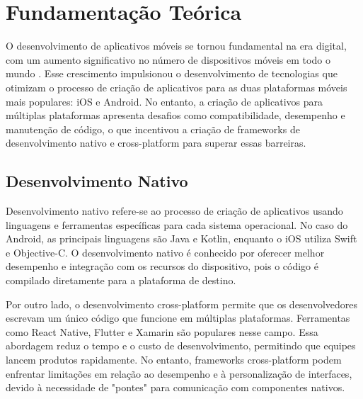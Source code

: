 \chapter{Fundamentação Teórica}
O desenvolvimento de aplicativos móveis se tornou fundamental na era digital, com um aumento significativo no número de dispositivos móveis em todo o mundo \cite{statista:uso_celular}. Esse crescimento impulsionou o desenvolvimento de tecnologias que otimizam o processo de criação de aplicativos para as duas plataformas móveis mais populares: iOS e Android. No entanto, a criação de aplicativos para múltiplas plataformas apresenta desafios como compatibilidade, desempenho e manutenção de código, o que incentivou a criação de frameworks de desenvolvimento nativo e cross-platform para superar essas barreiras.

\section{Desenvolvimento Nativo}
Desenvolvimento nativo refere-se ao processo de criação de aplicativos usando linguagens e ferramentas específicas para cada sistema operacional. No caso do Android, as principais linguagens são Java e Kotlin, enquanto o iOS utiliza Swift e Objective-C. O desenvolvimento nativo é conhecido por oferecer melhor desempenho e integração com os recursos do dispositivo, pois o código é compilado diretamente para a plataforma de destino.

Por outro lado, o desenvolvimento cross-platform permite que os desenvolvedores escrevam um único código que funcione em múltiplas plataformas. Ferramentas como React Native, Flutter e Xamarin são populares nesse campo. Essa abordagem reduz o tempo e o custo de desenvolvimento, permitindo que equipes lancem produtos rapidamente. No entanto, frameworks cross-platform podem enfrentar limitações em relação ao desempenho e à personalização de interfaces, devido à necessidade de "pontes" para comunicação com componentes nativos.